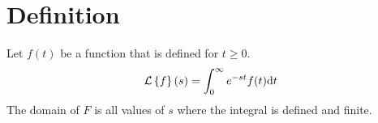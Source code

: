 \section{Definition}
\begin{definition}
	Let $f(t)$ be a function that is defined for $t \geq 0$.
	\begin{equation*}
		\mathcal{L}\left\{ f \right\}\left(s\right) = \int_{0}^{\infty}{e^{-st}f(t) \mathrm{d}t}
	\end{equation*}
	The domain of $F$ is all values of $s$ where the integral is defined and finite.
\end{definition}

